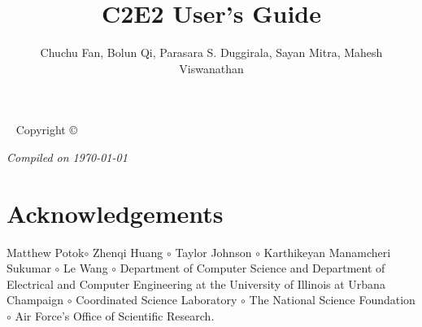 \documentclass{tufte-book} %
\title{C2E2 User's Guide} %
\author{Chuchu Fan, Bolun Qi, Parasara S. Duggirala, Sayan Mitra, Mahesh Viswanathan} %
\newcommand{\openepigraph}[2]{ %
\begin{fullwidth}
\sffamily\large
\begin{doublespace}
\noindent\allcaps{#1}\\ %
\noindent\allcaps{#2} %
\end{doublespace}
\end{fullwidth}
}
\begin{document}
\frontmatter





\maketitle %


\newpage
\begin{fullwidth}
~\vfill
\thispagestyle{empty}
\setlength{\parindent}{0pt}
\setlength{\parskip}{\baselineskip}
Copyright \copyright\ \the\year\ \thanklessauthor




\par\textit{Compiled on \today}
\end{fullwidth}


\tableofcontents %





\mainmatter

\chapter{Acknowledgements}
\label{sec:ack}
Matthew Potok$\circ$
Zhenqi Huang $\circ$
Taylor Johnson $\circ$ 
Karthikeyan Manamcheri Sukumar $\circ$
Le Wang $\circ$
Department of Computer Science and Department of Electrical and Computer Engineering at the University of Illinois at Urbana Champaign $\circ$
Coordinated Science Laboratory $\circ$
The National Science Foundation $\circ$ 
Air Force's Office of Scientific Research.
\end{document}
